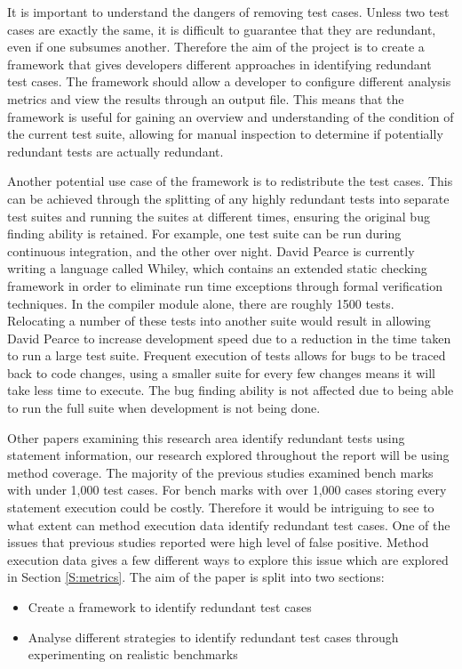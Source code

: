 It is important to understand the dangers of removing test cases. Unless two test cases are exactly the same, it is difficult to guarantee that they are redundant, even if one subsumes another. Therefore the aim of the project is to create a framework that gives developers different approaches in identifying redundant test cases. The framework should allow a developer to configure different analysis metrics and view the results through an output file. This means that the framework is useful for gaining an overview and understanding of the condition of the current test suite, allowing for manual inspection to determine if potentially redundant tests are actually redundant.

Another potential use case of the framework is to redistribute the test cases. This can be achieved through the splitting of any highly redundant tests into separate test suites and running the suites at different times, ensuring the original bug finding ability is retained. For example, one test suite can be run during continuous integration, and the other over night.
David Pearce is currently writing a language called Whiley, which contains an extended static checking framework in order to eliminate run time exceptions through formal verification techniques. In the compiler module alone, there are roughly 1500 tests. Relocating a number of these tests into another suite would result in allowing David Pearce to increase development speed due to a reduction in the time taken to run a large test suite. Frequent execution of tests allows for bugs to be traced back to code changes, using a smaller suite for every few changes means it will take less time to execute. The bug finding ability is not affected due to being able to run the full suite when development is not being done. 

Other papers examining this research area identify redundant tests using statement information, our research explored throughout the report will be using method coverage. The majority of the previous studies examined bench marks with under 1,000 test cases. For bench marks with over 1,000 cases storing every statement execution could be costly. Therefore it would be intriguing to see to what extent can method execution data identify redundant test cases. One of the issues that previous studies reported were high level of false positive. Method execution data gives a few different ways to explore this issue which are explored in Section \ref{S:metrics}. The aim of the paper is split into two sections: 

\begin{itemize}
\item Create a framework to identify redundant test cases
\item Analyse different strategies to identify redundant test cases through experimenting on realistic benchmarks
\end{itemize}


